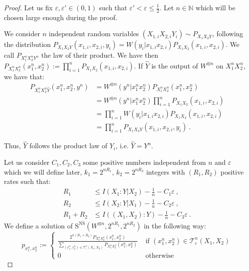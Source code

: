   \begin{proof}
    Let us fix $\varepsilon,\varepsilon' \in (0,1)$ such that $\varepsilon' < \varepsilon \leq \frac{1}{2}$. Let $n \in \mathbb{N}$ which will be chosen large enough during the proof.

    We consider $n$ independent random variables $(X_{1,i}X_{2,i}Y_i) \sim P_{X_1X_2Y}$, following the distribution $P_{X_1X_2Y}(x_{1,i},x_{2,i},y_i) = W(y_i|x_{1,i}x_{2,i})P_{X_1X_2}(x_{1,i},x_{2,i})$. We call $P_{X_1^nX_2^nY^n} $ the law of their product. We have then $P_{X_1^nX_2^n}(x_1^n,x_2^n) := \prod_{i=1}^n P_{X_1X_2}(x_{1,i},x_{2,i})$. If $\hat{Y}$ is the output of $W^{\otimes n}$ on $X_1^nX_2^n$, we have that:
      \begin{equation}
        \begin{aligned}
          P_{X_1^nX_2^n\hat{Y}}(x_1^n,x_2^n,y^n) &= W^{\otimes n}(y^n|x_1^nx_2^n)P_{X_1^nX_2^n}(x_1^n,x_2^n)\\
          &= W^{\otimes n}(y^n|x_1^nx_2^n)\prod_{i=1}^n P_{X_1X_2}(x_{1,i},x_{2,i})\\
          &= \prod_{i=1}^n W(y_i|x_{1,i}x_{2,i})P_{X_1X_2}(x_{1,i},x_{2,i})\\
          &= \prod_{i=1}^n P_{X_1X_2Y}(x_{1,i},x_{2,i},y_i) \ .
        \end{aligned}
      \end{equation}

      Thus, $\hat{Y}$ follows the product law of $Y_i$, i.e.  $\hat{Y} = Y^n$.
      
  Let us consider $C_1,C_2,C_3$ some positive numbers independent from $n$ and $\varepsilon$ which we will define later,  $k_1 = 2^{nR_1}$, $k_2 = 2^{nR_2}$ integers with $(R_1,R_2)$ positive rates such that:
  \begin{equation}
      \begin{aligned}
        R_1 &\leq I(X_1:Y|X_2) - \frac{1}{n} - C_1\varepsilon \ ,\\
        R_2 &\leq I(X_2:Y|X_1) - \frac{1}{n} - C_2\varepsilon \ ,\\
        R_1+R_2 &\leq I((X_1,X_2):Y) - \frac{1}{n} - C_3\varepsilon \ .
      \end{aligned}
    \end{equation}
  We define a solution of $\mathrm{S}^{\overline{\mathrm{NS}}}(W^{\otimes n},2^{nR_1},2^{nR_2})$ in the following way:
  \[ p_{x_1^n,x_2^n} := \begin{cases}
    \frac{2^{n(R_1+R_2)}P_{X_1^nX_2^n}(x_1^n,x_2^n)}{\sum_{(x_1^n,x_2^n) \in \mathcal{T}^n_{\varepsilon}(X_1,X_2)}P_{X_1^nX_2^n}(x_1^n,x_2^n)} & \text{ if } (x_1^n,x_2^n) \in \mathcal{T}^n_{\varepsilon}(X_1,X_2) \\
    0 & \text{ otherwise}
  \end{cases}
  \]


\end{proof}
